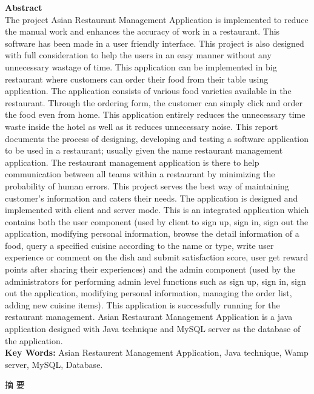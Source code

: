 \documentclass[12pt,a4paper]{article}
\newcommand{\zh}[1]{\begin{CJK}{UTF8}{gbsn}#1\end{CJK}}
\newcommand\tab[1][1cm]{\hspace*{#1}}
\begin{document}
	\begin{titlepage}
		\centering 
		{\fontsize{16}{10}\selectfont \textbf{Abstract}}\\
		\vspace{0.6cm}
		\RaggedRight \tab The project Asian Restaurant Management Application is implemented to reduce the
manual work and enhances the accuracy of work in a restaurant. This software has been made
in a user friendly interface. This project is also designed with full consideration to help the
users in an easy manner without any unnecessary wastage of time. This application can be
implemented in big restaurant where customers can order their food from their table using
application. The application consists of various food varieties available in the restaurant.
Through the ordering form, the customer can simply click and order the food even from
home. This application entirely reduces the unnecessary time waste inside the hotel as well as
it reduces unnecessary noise. This report documents the process of designing, developing and
testing a software application to be used in a restaurant; usually given the name restaurant
management application. The restaurant management application is there to help
communication between all teams within a restaurant by minimizing the probability of human
errors. This project serves the best way of maintaining customer’s information and caters
their needs. The application is designed and implemented with client and server mode. This is
an integrated application which contains both the user component (used by client to sign up,
sign in, sign out the application, modifying personal information, browse the detail
information of a food, query a specified cuisine according to the name or type, write user
experience or comment on the dish and submit satisfaction score, user get reward points after
sharing their experiences) and the admin component (used by the administrators for
performing admin level functions such as sign up, sign in, sign out the application, modifying
personal information, managing the order list, adding new cuisine items). This application is
successfully running for the restaurant management. Asian Restaurant Management
Application is a java application designed with Java technique and MySQL server as the
database of the application.\\
\vspace{0.8cm}
{\bfseries Key Words: } Asian Restaurent Management Application, Java technique, Wamp server, MySQL, Database.
	\newpage
	\thispagestyle{empty}
	\centering\zh{摘 要}\\
	\vspace{0.5cm}
	

\end{titlepage}
\end{document}
